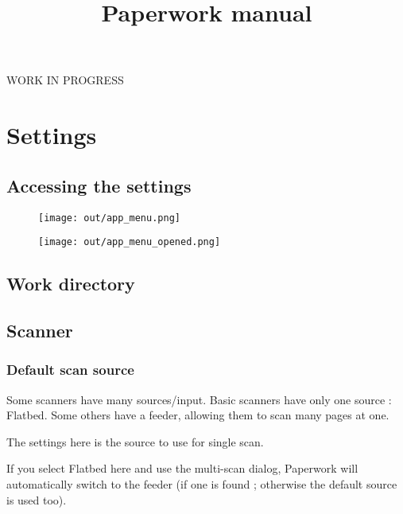 \documentclass[10pt,a4paper]{article}
\date{}
\title{Paperwork manual}
\begin{document}
\maketitle

WORK IN PROGRESS

\pagebreak

\tableofcontents

\pagebreak

\section{Settings}

\subsection{Accessing the settings}

\begin{figure}[H]
\texttt{[image: out/app\_menu.png]}
\end{figure}

\begin{figure}[H]
\texttt{[image: out/app\_menu\_opened.png]}
\end{figure}


\subsection{Work directory}

\subsection{Scanner}

\subsubsection{Default scan source}

Some scanners have many sources/input. Basic scanners have only one
source : Flatbed. Some others have a feeder, allowing them to scan
many pages at one.

The settings here is the source to use for single scan.

If you select Flatbed here and use the
multi-scan dialog, Paperwork will
automatically switch to the feeder (if one is found ; otherwise the
default source is used too).

\end{document}
